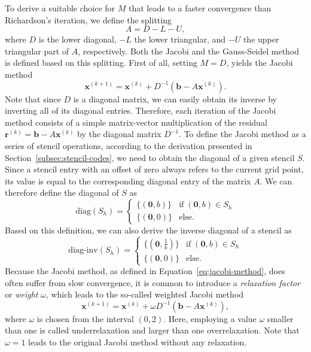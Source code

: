 To derive a suitable choice for $M$ that leads to a faster convergence than Richardson's iteration, we define the splitting
\begin{equation}
	A = D - L - U,
\end{equation} 
where $D$ is the lower diagonal, $-L$ the lower triangular, and $-U$ the upper triangular part of $A$, respectively.
Both the Jacobi and the Gauss-Seidel method is defined based on this splitting.
First of all, setting $M = D$, yields the Jacobi method
\begin{equation}
	\bm{x}^{(k+1)} = \bm{x}^{(k)} + D^{-1}(\bm b - A \bm{x}^{(k)}).
	\label{eq:jacobi-method}
\end{equation}
Note that since $D$ is a diagonal matrix, we can easily obtain its inverse by inverting all of its diagonal entries.
Therefore, each iteration of the Jacobi method consists of a simple matrix-vector multiplication of the residual $\bm{r}^{(k)} = \bm{b} - A \bm{x}^{(k)}$ by the diagonal matrix $D^{-1}$.
To define the Jacobi method as a series of stencil operations, according to the derivation presented in Section~\ref{subsec:stencil-codes}, we need to obtain the diagonal of a given stencil $S$.
Since a stencil entry with an offset of zero always refers to the current grid point, its value is equal to the corresponding diagonal entry of the matrix $A$.
We can therefore define the diagonal of $S$ as
\begin{equation}
	\text{diag}(S_h) = \begin{cases}
		\{(\bm{0}, b) \} & \text{if} \; (\bm 0, b) \in S_h \\
		\{(\bm{0}, 0) \} & \text{else}.
	\end{cases}
	\label{eq:stencil-diag}
\end{equation}
Based on this definition, we can also derive the inverse diagonal of a stencil as
\begin{equation}
	\text{diag-inv}(S_h) = \begin{cases}
		\{(\bm{0}, \frac{1}{b}) \} & \text{if} \; (\bm 0, b) \in S_h \\
		\{(\bm{0}, 0) \} & \text{else}.
	\end{cases}
	\label{eq:stencil-diag-inv}
\end{equation}
Because the Jacobi method, as defined in Equation~\eqref{eq:jacobi-method}, does often suffer from slow convergence, it is common to introduce a \emph{relaxation factor} or \emph{weight} $\omega$, which leads to the so-called weighted Jacobi method
\begin{equation}
	\bm{x}^{(k+1)} = \bm{x}^{(k)} + \omega D^{-1}(\bm b - A \bm{x}^{(k)}),
	\label{eq:weighted-jacobi-method}
\end{equation}
where $\omega$ is chosen from the interval $\left(0, 2\right)$.
Here, employing a value $\omega$ smaller than one is called underrelaxation and larger than one overrelaxation.
Note that $\omega = 1$ leads to the original Jacobi method without any relaxation.

